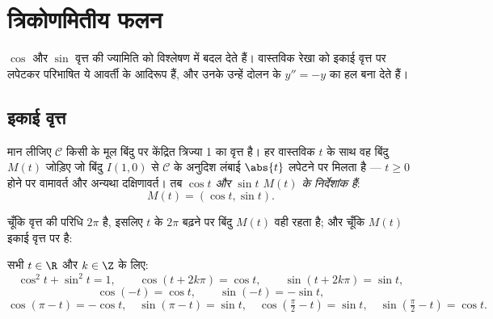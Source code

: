 \chapter{त्रिकोणमितीय फलन}\label{ch:g12:trigo}

 $\cos$ और $\sin$ वृत्त की ज्यामिति को विश्लेषण में बदल देते हैं। वास्तविक रेखा
को इकाई वृत्त पर लपेटकर परिभाषित ये  आवर्ती  के आदिरूप हैं, और उनके
 उन्हें दोलन के  $y'' = -y$ का हल बना देते हैं।

\section{इकाई वृत्त}

\begin{definition}[कोज्या और ज्या]\label{def:g12:trigo:cossin}
मान लीजिए $\mathcal{C}$ किसी   के मूल बिंदु पर केंद्रित
त्रिज्या 1 का वृत्त है। हर वास्तविक $t$ के साथ वह बिंदु $M(t)$ जोड़िए जो बिंदु
$I(1,0)$ से $\mathcal{C}$ के अनुदिश लंबाई $\abs{t}$ लपेटने पर मिलता है --- $t \geq 0$ होने पर वामावर्त
और अन्यथा दक्षिणावर्त। तब \emph{$\cos t$ और $\sin t$ $M(t)$ के
निर्देशांक हैं}:
\[
M(t) = (\cos t, \sin t).
\]
\end{definition}

\begin{omfigure}
\end{omfigure}

चूँकि वृत्त की परिधि $2\pi$ है, इसलिए $t$ के $2\pi$ बढ़ने पर बिंदु $M(t)$ वही रहता
है; और चूँकि $M(t)$ इकाई वृत्त पर है:

\begin{proposition}[मूलभूत सर्वसमिकाएँ]\label{prop:g12:trigo:identities}
सभी $t \in \R$ और $k \in \Z$ के लिए:
\[
\cos^2 t + \sin^2 t = 1, \qquad
\cos(t + 2k\pi) = \cos t, \qquad
\sin(t + 2k\pi) = \sin t,
\]
\[
\cos(-t) = \cos t, \qquad \sin(-t) = -\sin t,
\]
\[
\cos(\pi - t) = -\cos t, \quad \sin(\pi - t) = \sin t, \quad
\cos\left(\tfrac{\pi}{2} - t\right) = \sin t, \quad
\sin\left(\tfrac{\pi}{2} - t\right) = \cos t .
\]
\end{proposition}

